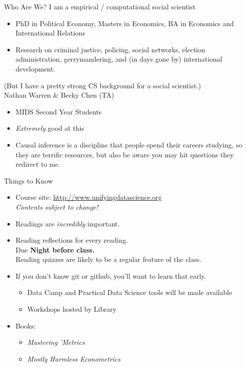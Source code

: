 \documentclass[11pt]{beamer}
\begin{document}
  
  \begin{frame}[c]{Who Are We?}
        I am a empirical / computational social scientist
        \begin{itemize}
            \pause \item PhD in Political Economy, Masters in Economics, BA in Economics and International Relations
        \item Research on criminal justice, policing, social networks, election administration, gerrymandering, and (in days gone by) international development. 
        \end{itemize}
        \pause (But I have a pretty strong CS background for a social scientist.)\\
      \vspace*{0.2cm}
      \pause Nathan Warren \& Becky Chen (TA) 
      \begin{itemize}
        \pause \item MIDS Second Year Students
         \item \emph{Extremely} good at this
         \pause \item Causal inference is a discipline that people spend their careers studying, so they are terrific resources, but also be aware you may hit questions they redirect to me. 
      \end{itemize}
  \end{frame}
  
  \begin{frame}[c]{Things to Know}
  \begin{itemize}
    \item Course site: \url{http://www.unifyingdatascience.org} \\
    \emph{Contents subject to change!}
    \pause \item Readings are \emph{incredibly} important. \\
    \pause \item Reading reflections for every reading. \\
    Due \textbf{Night before class.} \\
    \pause Reading quizzes are likely to be a regular feature of the class. \\
    \pause \item If you don't know git or github, you'll want to learn that early.
    \begin{itemize}
      \item Data Camp and Practical Data Science tools will be made available
      \item Workshops hosted by Library
    \end{itemize}
    \pause \item Books: 
    \begin{itemize}
      \item \emph{Mastering 'Metrics}
      \item \emph{Mostly Harmless Econometrics}
    \end{itemize}
  \end{itemize}
  \end{frame}
  
\end{document}

